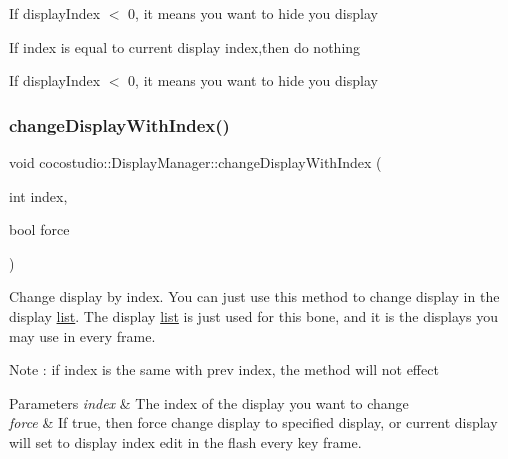 If display\+Index $<$ 0, it means you want to hide you display

If index is equal to current display index,then do nothing

If display\+Index $<$ 0, it means you want to hide you display \mbox{\label{classcocostudio_1_1DisplayManager_ab0a8f7711c50c31d0c569c35bc62b4b2}} 
\subsubsection{\texorpdfstring{change\+Display\+With\+Index()}{changeDisplayWithIndex()}\hspace{0.1cm}{\footnotesize\ttfamily [2/2]}}
{\footnotesize\ttfamily void cocostudio\+::\+Display\+Manager\+::change\+Display\+With\+Index (\begin{DoxyParamCaption}\item[{int}]{index,  }\item[{bool}]{force }\end{DoxyParamCaption})}

Change display by index. You can just use this method to change display in the display \hyperlink{protocollist-p}{list}. The display \hyperlink{protocollist-p}{list} is just used for this bone, and it is the displays you may use in every frame.

Note \+: if index is the same with prev index, the method will not effect


\begin{DoxyParams}{Parameters}
{\em index} & The index of the display you want to change \\
\hline
{\em force} & If true, then force change display to specified display, or current display will set to display index edit in the flash every key frame. \\
\hline
\end{DoxyParams}
\mbox{\label{classcocostudio_1_1DisplayManager_ae29e9c2724c2917efea6b6a584a3d7bd}} 
